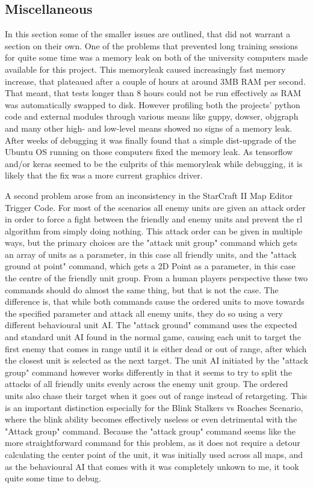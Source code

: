 \subsection{Miscellaneous}
In this section some of the smaller issues are outlined, that did not warrant a section on their own.
One of the problems that prevented long training sessions for quite some time was a memory leak on both of the university computers made available for this project. This memoryleak caused increasingly fast memory increase, that plateaued after a couple of hours at around 3MB RAM per second. That meant, that tests longer than 8 hours could not be run effectively as RAM was automatically swapped to disk. However profiling both the projects' python code and external modules through various means like guppy, dowser, objgraph and many other high- and low-level means showed no signs of a memory leak. After weeks of debugging it was finally found that a simple dist-upgrade of the Ubuntu OS running on those computers fixed the memory leak. As tensorflow and/or keras seemed to be the culprits of this memoryleak while debugging, it is likely that the fix was a more current graphics driver.

A second problem arose from an inconsistency in the StarCraft II Map Editor Trigger Code. For most of the scenarios all enemy units are given an attack order in order to force a fight between the friendly and enemy units and prevent the rl algorithm from simply doing nothing. This attack order can be given in multiple ways, but the primary choices are the "attack unit group" command which gets an array of units as a parameter, in this case all friendly units, and the "attack ground at point" command, which gets a 2D Point as a parameter, in this case the centre of the friendly unit group. From a human players perspective these two commands should do almost the same thing, but that is not the case. The difference is, that while both commands cause the ordered units to move towards the specified parameter and attack all enemy units, they do so using a very different behavioural unit AI. The "attack ground" command uses the expected and standard unit AI found in the normal game, causing each unit to target the first enemy that comes in range until it is either dead or out of range, after which the closest unit is selected as the next target. The unit AI initiated by the "attack group" command however works differently in that it seems to try to split the attacks of all friendly units evenly across the enemy unit group. The ordered units also chase their target when it goes out of range instead of retargeting. This is an important distinction especially for the Blink Stalkers vs Roaches Scenario, where the blink ability becomes effectively useless or even detrimental with the "Attack group" command.
Because the "attack group" command seems like the more straightforward command for this problem, as it does not require a detour calculating the center point of the unit, it was initially used across all maps, and as the behavioural AI that comes with it was completely unkown to me, it took quite some time to debug.